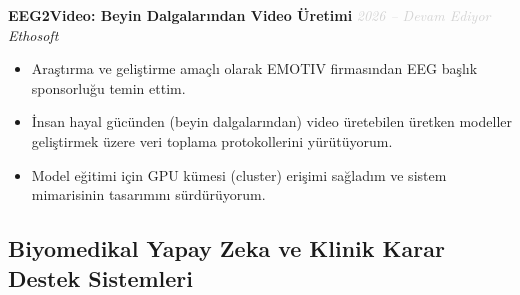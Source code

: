 \documentclass[11pt,a4paper]{article}
\newcommand{\blueitem}[1]{\textcolor{subtitleblue}{\textbf{#1}}}
\newcommand{\daterange}[1]{\hfill \textcolor{lightgray}{\textit{#1}}}
\begin{document}
\blueitem{EEG2Video: Beyin Dalgalarından Video Üretimi} \daterange{2026 -- Devam Ediyor}\\
\textit{Ethosoft}
\begin{itemize}
    \item Araştırma ve geliştirme amaçlı olarak EMOTIV firmasından EEG başlık sponsorluğu temin ettim.
    \item İnsan hayal gücünden (beyin dalgalarından) video üretebilen üretken modeller geliştirmek üzere veri toplama protokollerini yürütüyorum.
    \item Model eğitimi için GPU kümesi (cluster) erişimi sağladım ve sistem mimarisinin tasarımını sürdürüyorum.
\end{itemize}

\subsection*{Biyomedikal Yapay Zeka ve Klinik Karar Destek Sistemleri}
\end{document}
